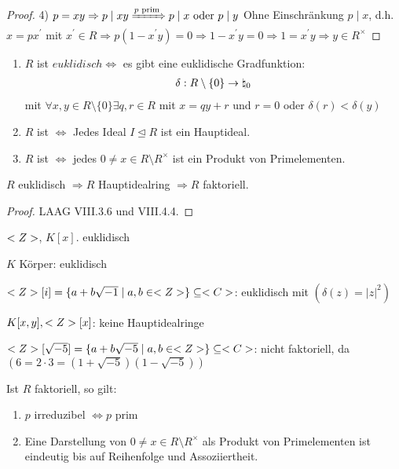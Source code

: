 \begin{proof}
	4) $p = xy \Rightarrow p \mid xy \xRightarrow{p \text{ prim}} p \mid x \text{ oder } p\mid y$ Ohne Einschränkung $p \mid x$, d.h. $x = px^{'}$ mit $x^{'} \in R \Rightarrow p(1-x^{'}y) =0 \Rightarrow 1 - x^{'}y = 0 \Rightarrow 1 = x^{'}y \Rightarrow y \in R^{\times}$
\end{proof}

\begin{definition}
	\begin{enumerate}
		\item $R$ ist $euklidisch \Leftrightarrow$ es gibt eine euklidische Gradfunktion:
		\begin{align}
			\delta: R\setminus \{0\} \to \natural_0 \notag
		\end{align}
		mit $\forall x,y \in R\setminus \{0\} \exists q,r \in R$ mit $x = qy + r$ und $r=0$ oder $\delta(r) < \delta(y)$
		\item $R$ ist  $\Leftrightarrow$ Jedes Ideal $I \unlhd R$ ist ein Hauptideal.
		\item $R$ ist  $\Leftrightarrow$ jedes $0 \neq x \in R\setminus R^{\times}$ ist ein Produkt von Primelementen.
	\end{enumerate}
\end{definition}

\begin{proposition}
	$R$ euklidisch $\Rightarrow R$ Hauptidealring $\Rightarrow R$ faktoriell.
\end{proposition}

\begin{proof}
	LAAG VIII.3.6 und VIII.4.4.
\end{proof}

\begin{example}
	\item $<Z>$, $K[x]$. euklidisch
	\item $K$ Körper: euklidisch
	\item $<Z>[i] = \{ a+b\sqrt{-1} \mid a,b \in <Z> \} \subseteq <C>$: euklidisch mit $(\delta(z) = \vert z \vert^2)$
	\item $K[x,y], <Z>[x]$: keine Hauptidealringe
	\item $<Z>[\sqrt{-5}] = \{ a+b\sqrt{-5} \mid a,b \in <Z> \} \subseteq <C>$: nicht faktoriell, da $(6 = 2\cdot 3 = (1 + \sqrt{-5})(1-\sqrt{-5}))$
\end{example}

\begin{remark}
	Ist $R$ faktoriell, so gilt:
	\begin{enumerate}
		\item $p$ irreduzibel $\Leftrightarrow p$ prim
		\item Eine Darstellung von $0 \neq x \in R \setminus R^{\times}$ als Produkt von Primelementen ist eindeutig bis auf Reihenfolge und Assoziiertheit.
	\end{enumerate}
\end{remark}